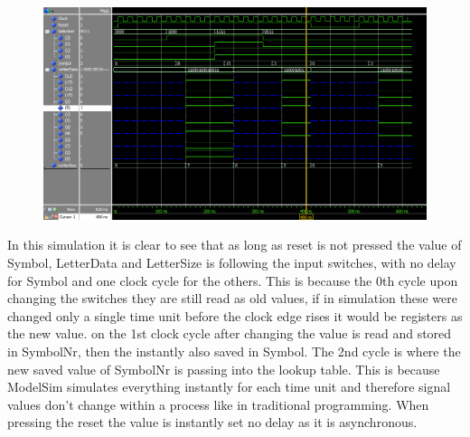 \documentclass{article}
\begin{document}
\begin{figure}[h]
    \centering
    \includegraphics[width=1\textwidth]{Figures/LetterSelectorTB.PNG}
    \label{fig:TB_Sel}
\end{figure}
In this simulation it is clear to see that as long as reset is not pressed the value of Symbol, LetterData and LetterSize is following the input switches, with no delay for Symbol and one clock cycle for the others. This is because the 0th cycle upon changing the switches they are still read as old values, if in simulation these were changed only a single time unit before the clock edge rises it would be registers as the new value. on the 1st clock cycle after changing the value is read and stored in SymbolNr, then the instantly also saved in Symbol. The 2nd cycle is where the new saved value of SymbolNr is passing into the lookup table. This is because ModelSim simulates everything instantly for each time unit and therefore signal values don't change within a process like in traditional programming. When pressing the reset the value is instantly set no delay as it is asynchronous. 
\end{document}
